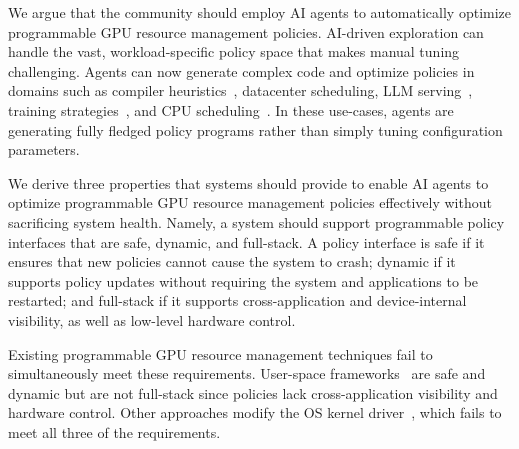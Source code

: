We argue that the community should employ AI agents to automatically optimize programmable GPU resource management policies.
AI-driven exploration can handle the vast, workload-specific policy space that makes manual tuning challenging.
Agents can now generate complex code and optimize policies in domains such as compiler heuristics~\cite{alphaevolve2025}, datacenter scheduling, LLM serving~\cite{hamadanian2025glia,cheng2025barbarians}, training strategies~\cite{ding2025asap}, and CPU scheduling~\cite{dwivedula2025policysmith,zheng2025schedcp}.
In these use-cases, agents are generating fully fledged policy programs rather than simply tuning configuration parameters.

We derive three properties that systems should provide to enable AI agents to optimize programmable GPU resource management policies effectively without sacrificing system health.
Namely, a system should support programmable policy interfaces that are safe, dynamic, and full-stack.
A policy interface is safe if it ensures that new policies cannot cause the system to crash; dynamic if it supports policy updates without requiring the system and applications to be restarted; and full-stack if it supports cross-application and device-internal visibility, as well as low-level hardware control.

Existing programmable GPU resource management techniques fail to simultaneously meet these requirements.
User-space frameworks~\cite{ng2023paella,shen2025xsched,gim2025pie,chen2025ktransformers} are safe and dynamic but are not full-stack since policies lack cross-application visibility and hardware control.
Other approaches modify the OS kernel driver~\cite{kato2011timegraph,kato2012gdev,kernelintercept,fan2025gpreempt,wang2024gcaps}, which fails to meet all three of the requirements.

